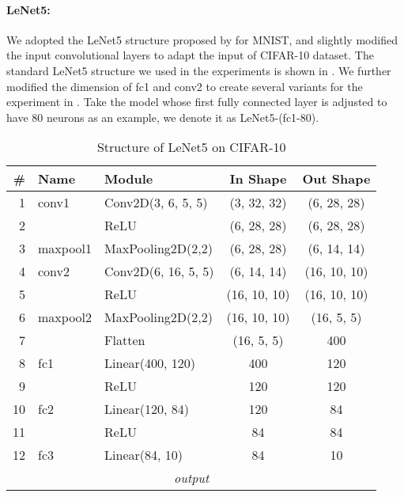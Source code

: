 \paragraph{LeNet5:} We adopted the LeNet5 structure proposed by \citet{lecun1998gradient} for MNIST, and slightly modified the input convolutional layers to adapt the input of CIFAR-10 dataset. The standard LeNet5 structure we used in the experiments is shown in . We further modified the dimension of fc1 and conv2 to create several variants for the experiment in . Take the model whose first fully connected layer is adjusted to have 80 neurons as an example, we denote it as LeNet5-(fc1-80).

\begin{table}[h]
\small
  \centering
  \caption{Structure of LeNet5 on CIFAR-10}
  \vskip 0.1in
    \begin{center}
    \begin{tabular}{rllcc}
    \toprule
    \# & Name & Module & In Shape & Out Shape\\\midrule
    1 & conv1 & Conv2D(3, 6, 5, 5) & (3, 32, 32) & (6, 28, 28)\\
    2 & & ReLU & (6, 28, 28) & (6, 28, 28)\\
    3 & maxpool1 & MaxPooling2D(2,2) & (6, 28, 28) & (6, 14, 14)\\
    4 & conv2 & Conv2D(6, 16, 5, 5) & (6, 14, 14) & (16, 10, 10)\\
    5 & & ReLU & (16, 10, 10) & (16, 10, 10)\\
    6 & maxpool2 & MaxPooling2D(2,2) & (16, 10, 10) & (16, 5, 5)\\
    7 & & Flatten & (16, 5, 5) & 400\\
    8 & fc1 & Linear(400, 120) & 400 & 120\\
    9 & & ReLU & 120 & 120\\
    10 & fc2 & Linear(120, 84) & 120 & 84\\
    11 & & ReLU & 84 & 84\\
    12 & fc3 & Linear(84, 10) & 84 & 10\\
    \multicolumn{5}{c}{\emph{output}} \\\bottomrule
    \end{tabular}%
\end{center}
  \label{tab:appendix_lenet_struct}%
\end{table}%

